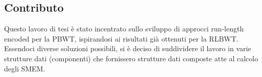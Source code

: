 \documentclass[a4paper,11pt, oneside,italian]{article}
\begin{document}
\subsection*{Contributo}


Questo lavoro di tesi è stato incentrato sullo sviluppo di approcci run-length
encoded per la PBWT, ispirandosi ai risultati già ottenuti per la RLBWT.
Essendoci diverse soluzioni
possibili,  si è deciso di suddividere il lavoro in varie strutture
dati (componenti) che  fornissero strutture dati composte atte al calcolo degli
SMEM. 
\end{document}
